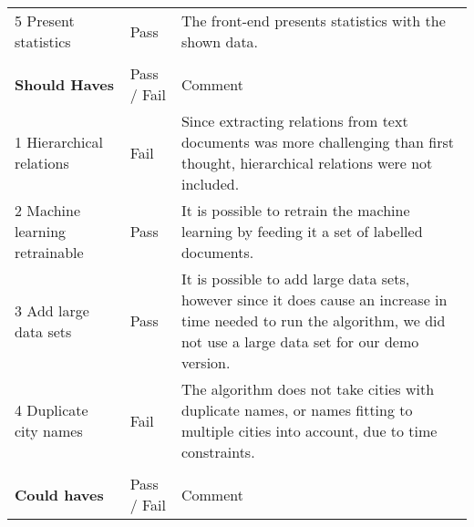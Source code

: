 \begin{table}[H]
\begin{tabular}{ll m{8cm}}
5 Present statistics           & Pass        & The front-end presents statistics with the shown data.                                                                                                                                                                                \\ 
                               &             &                                                                                                                                                                                                                                       \\
\textbf{Should Haves}                   & Pass / Fail & Comment                                                                                                                                                                                                                               \\
1 Hierarchical relations       & Fail        & Since extracting relations from text documents was more challenging than first thought, hierarchical relations were not included.                                                         \\ \hline
2 Machine learning retrainable & Pass        & It is possible to retrain the machine learning by feeding it a set of labelled documents.                                                                                                                                              \\ \hline
3 Add large data sets           & Pass        & It is possible to add large  data sets, however since it does cause an increase in time needed to run the algorithm, we did not use a large data set for our demo version.                     \\ \hline
4 Duplicate city names         & Fail        & The algorithm does not take cities with duplicate names, or names fitting to multiple cities into account, due to time constraints.                                                         \\
                               &             &                                                                                                                                                                                                                                       \\
\textbf{Could haves}                    & Pass / Fail & Comment                                                                                                                                                                                                                               \\

\end{tabular}
\end{table}
